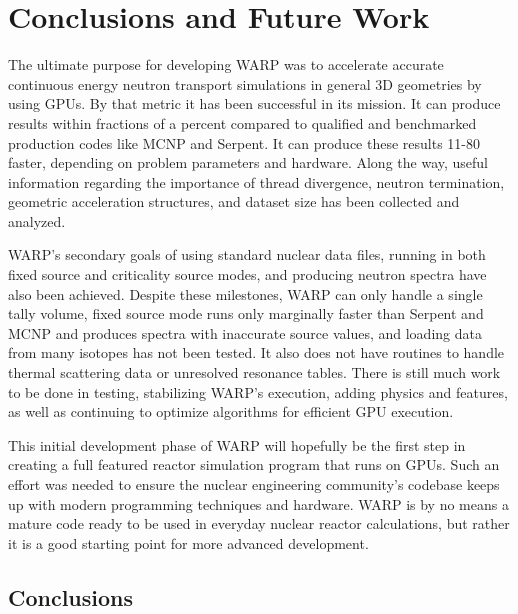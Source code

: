 \chapter{Conclusions and Future Work}
\label{chap:conclusions}

The ultimate purpose for developing WARP was to accelerate accurate continuous energy neutron transport simulations in general 3D geometries by using GPUs.  By that metric it has been successful in its mission.  It can produce results within fractions of a percent compared to qualified and benchmarked production codes like MCNP and Serpent.  It can produce these results 11-80 faster, depending on problem parameters and hardware.  Along the way, useful information regarding the importance of thread divergence, neutron termination, geometric acceleration structures, and dataset size has been collected and analyzed.

WARP's secondary goals of using standard nuclear data files, running in both fixed source and criticality source modes, and producing neutron spectra have also been achieved.  Despite these milestones, WARP can only handle a single tally volume, fixed source mode runs only marginally faster than Serpent and MCNP and produces spectra with inaccurate source values, and loading data from many isotopes has not been tested.  It also does not have routines to handle thermal scattering data or unresolved resonance tables. There is still much work to be done in testing, stabilizing WARP's execution, adding physics and features, as well as continuing to optimize algorithms for efficient GPU execution.

This initial development phase of WARP will hopefully be the first step in creating a full featured reactor simulation program that runs on GPUs.  Such an effort was needed to ensure the nuclear engineering community's codebase keeps up with modern programming techniques and hardware.  WARP is by no means a mature code ready to be used in everyday nuclear reactor calculations, but rather it is a good starting point for more advanced development.


\section{Conclusions}

